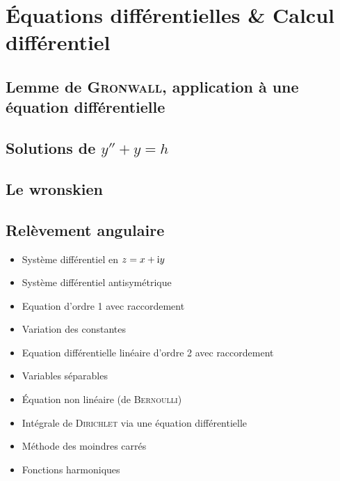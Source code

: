 \chapter{Équations différentielles \& Calcul différentiel }


\section{Lemme de \textsc{Gronwall}, application à une équation différentielle}


\section{Solutions de $y'' + y = h$}


\section{Le wronskien}


\section{Relèvement angulaire}


\begin{itemize}
    \item Système différentiel en $z = x + \mathrm{i} y$
    \item Système différentiel antisymétrique
    \item Equation d'ordre 1 avec raccordement
    \item Variation des constantes
    \item Equation différentielle linéaire d'ordre 2 avec raccordement
    \item Variables séparables
    \item Équation non linéaire (de \textsc{Bernoulli})
    \item Intégrale de \textsc{Dirichlet} via une équation différentielle
    \item Méthode des moindres carrés
    \item Fonctions harmoniques
\end{itemize}